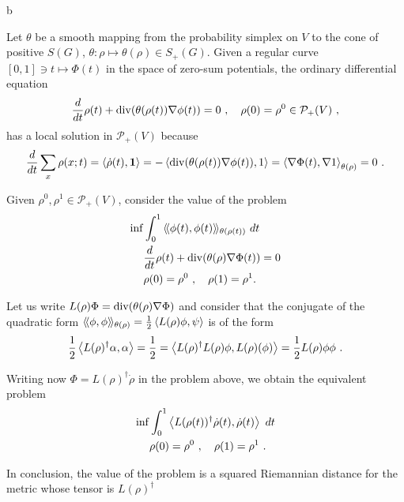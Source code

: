 b\documentclass[12pt,a4paper]{amsart}
\begin{document}
Let $\theta$ be a smooth mapping from the probability simplex on $V$ to the
cone of positive $S(G)$, $\theta \colon \rho \mapsto \theta(\rho) \in
S_+(G)$. Given a regular curve $[0,1] \ni t \mapsto \Phi(t)$ in the
space of zero-sum potentials, the ordinary differential equation
\begin{equation*}
  \derivby t \rho(t) +  \Div(\theta(\rho(t))\nabla \phi(t)) = 0 \ , \quad
  \rho(0) = \rho^0 \in \mathcal P_+(V) \ ,
\end{equation*}
has a local solution in $\mathcal P_+(V)$ because
\begin{equation*}
  \derivby t \sum_x \rho(x;t) = \scalarof {\dot \rho(t)}{\one} = 
 - \scalarof {\Div(\theta(\rho(t))\nabla \phi(t))}{1} = \scalarat
 {\theta(\rho)} {\nabla \Phi(t)}{\nabla 1}
 = 0 \ .
\end{equation*}

Given $\rho^0, \rho^1 \in \mathcal P_+(V)$, consider the value of the problem
\begin{align*}
 \inf &\int_0^1 \Scalarat {\theta(\rho(t))} {\phi(t)}{\phi(t)} \ dt
 \\
 &\derivby t \rho(t) +  \Div(\theta(\rho)\nabla \Phi(t)) = 0 \\
 &\rho(0) = \rho^0 \ , \quad \rho(1) = \rho^1.
\end{align*}

Let us write $L(\rho)\Phi = \Div(\theta(\rho)\nabla \Phi)$ and
consider that the conjugate of the quadratic form
$\Scalarat {\theta(\rho)} \phi \phi = \frac 12 \scalarof {L(\rho)\phi}
\psi$ is of the form
\begin{equation*}
  \frac 12 \scalarof {L(\rho)^\dagger \alpha} {\alpha} = \frac12 =
  \scalarof {L(\rho)^\dagger L(\rho) \phi} {L(\rho)(\phi)} = \frac12
  {L(\rho) \phi} \phi \ . 
\end{equation*}

Writing now $\Phi = L(\rho)^\dagger \dot \rho$ in the problem above,
we obtain the equivalent problem
\begin{align*}
 \inf &\int_0^1 \scalarof {L(\rho(t))^\dagger \dot \rho(t)}{\dot \rho(t)} \ dt
 \\
 &\rho(0) = \rho^0 \ , \quad \rho(1) = \rho^1 \ .
\end{align*}

In conclusion, the value of the problem is a squared Riemannian
distance for the metric whose tensor is $L(\rho)^\dagger$



\end{document}
